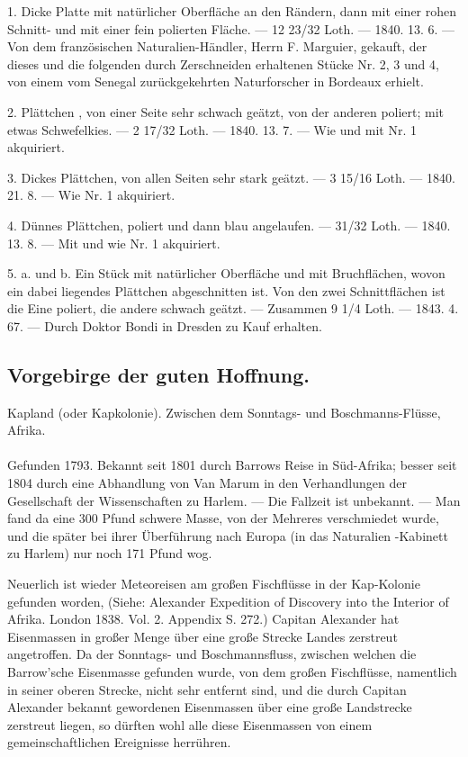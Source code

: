 \documentclass[a4paper, 11pt, oneside, polutonikogreek, german]{article}
\begin{document}
1. Dicke Platte mit natürlicher Oberfläche an den Rändern, dann mit einer rohen Schnitt- und mit einer fein polierten Fläche. — 12 23/32 Loth. — 1840. 13. 6. — Von dem französischen Naturalien-Händler, Herrn F. Marguier, gekauft, der dieses und die folgenden durch Zerschneiden erhaltenen Stücke Nr. 2, 3 und 4, von einem vom Senegal zurückgekehrten Naturforscher in Bordeaux erhielt.

2. Plättchen , von einer Seite sehr schwach geätzt, von der anderen poliert; mit etwas Schwefelkies. — 2 17/32 Loth. — 1840. 13. 7. — Wie und mit Nr. 1 akquiriert.

3. Dickes Plättchen, von allen Seiten sehr stark geätzt. — 3 15/16 Loth. — 1840. 21. 8. — Wie Nr. 1 akquiriert.

4. Dünnes Plättchen, poliert und dann blau angelaufen. — 31/32 Loth. — 1840. 13. 8. — Mit und wie Nr. 1 akquiriert.

5. a. und b. Ein Stück mit natürlicher Oberfläche und mit Bruchflächen, wovon ein dabei liegendes Plättchen abgeschnitten ist. Von den zwei Schnittflächen ist die Eine poliert, die andere schwach geätzt. — Zusammen 9 1/4 Loth. — 1843. 4. 67. — Durch Doktor Bondi in Dresden zu Kauf erhalten.
\subsection{Vorgebirge der guten Hoffnung.}
\begin{center}
\small
Kapland (oder Kapkolonie). Zwischen dem Sonntags- und Boschmanns-Flüsse, Afrika.
\end{center}
\paragraph{}
Gefunden 1793. Bekannt seit 1801 durch Barrows Reise in Süd-Afrika; besser seit 1804 durch eine Abhandlung von Van Marum in den Verhandlungen der Gesellschaft der Wissenschaften zu Harlem. — Die Fallzeit ist unbekannt. — Man fand da eine 300 Pfund schwere Masse, von der Mehreres verschmiedet wurde, und die später bei ihrer Überführung nach Europa (in das Naturalien -Kabinett zu Harlem) nur noch 171 Pfund wog.

Neuerlich ist wieder Meteoreisen am großen Fischflüsse in der Kap-Kolonie gefunden worden, (Siehe: Alexander Expedition of Discovery into the Interior of Afrika. London 1838. Vol. 2. Appendix S. 272.) Capitan Alexander hat Eisenmassen in großer Menge über eine große Strecke Landes zerstreut angetroffen. Da der Sonntags- und Boschmannsfluss, zwischen welchen die Barrow'sche Eisenmasse gefunden wurde, von dem großen Fischflüsse, namentlich in seiner oberen Strecke, nicht sehr entfernt sind, und die durch Capitan Alexander bekannt gewordenen Eisenmassen über eine große Landstrecke zerstreut liegen, so dürften wohl alle diese Eisenmassen von einem gemeinschaftlichen Ereignisse herrühren.
\end{document}
